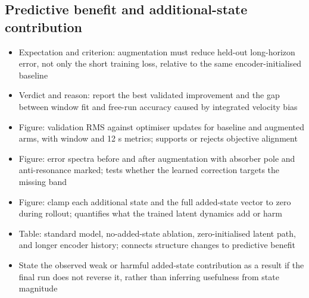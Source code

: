 \subsection{Predictive benefit and additional-state contribution}
\begin{itemize}
\item Expectation and criterion: augmentation must reduce held-out long-horizon error, not only the short training loss, relative to the same encoder-initialised baseline
\item Verdict and reason: report the best validated improvement and the gap between window fit and free-run accuracy caused by integrated velocity bias
\item Figure: validation RMS against optimiser updates for baseline and augmented arms, with window and 12 s metrics; supports or rejects objective alignment
\item Figure: error spectra before and after augmentation with absorber pole and anti-resonance marked; tests whether the learned correction targets the missing band
\item Figure: clamp each additional state and the full added-state vector to zero during rollout; quantifies what the trained latent dynamics add or harm
\item Table: standard model, no-added-state ablation, zero-initialised latent path, and longer encoder history; connects structure changes to predictive benefit
\item State the observed weak or harmful added-state contribution as a result if the final run does not reverse it, rather than inferring usefulness from state magnitude
\end{itemize}

